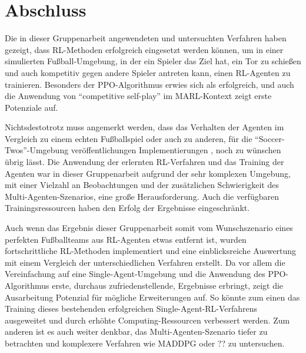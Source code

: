 \chapter{Abschluss} \label{chapter:4}

Die in dieser Gruppenarbeit angewendeten und untersuchten Verfahren haben gezeigt, dass \ac{RL}-Methoden erfolgreich eingesetzt werden können, um in einer simulierten Fußball-Umgebung, in der ein Spieler das Ziel hat, ein Tor zu schießen und auch kompetitiv gegen andere Spieler antreten kann, einen \ac{RL}-Agenten zu trainieren. Besonders der \ac{PPO}-Algorithmus erwies sich als erfolgreich, und auch die Anwendung von \enquote{competitive self-play} im \ac{MARL}-Kontext zeigt erste Potenziale auf.

Nichtsdestotrotz muss angemerkt werden, dass das Verhalten der Agenten im Vergleich zu einem echten Fußballspiel oder auch zu anderen, für die \enquote{Soccer-Twos}-Umgebung veröffentlichungen Implementierungen \cite{todo}, noch zu wünschen übrig lässt. Die Anwendung der erlernten \ac{RL}-Verfahren und das Training der Agenten war in dieser Gruppenarbeit aufgrund der sehr komplexen Umgebung, mit einer Vielzahl an Beobachtungen und der zusätzlichen Schwierigkeit des Multi-Agenten-Szenarios, eine große Herausforderung. Auch die verfügbaren Trainingsressourcen haben den Erfolg der Ergebnisse eingeschränkt.

Auch wenn das Ergebnis dieser Gruppenarbeit somit vom Wunschszenario eines perfekten Fußballteams aus \ac{RL}-Agenten etwas entfernt ist, wurden fortschrittliche \ac{RL}-Methoden implementiert und eine einblicksreiche Auswertung mit einem Vergleich der unterschiedlichen Verfahren erstellt. Da vor allem die Vereinfachung auf eine Single-Agent-Umgebung und die Anwendung des \ac{PPO}-Algorithmus erste, durchaus zufriedenstellende, Ergebnisse erbringt, zeigt die Ausarbeitung Potenzial für mögliche Erweiterungen auf. So könnte zum einen das Training dieses bestehenden erfolgreichen Single-Agent-RL-Verfahrens ausgeweitet und durch erhöhte Computing-Ressourcen verbessert werden. Zum anderen ist es auch weiter denkbar, das Multi-Agenten-Szenario tiefer zu betrachten und komplexere Verfahren wie MADDPG oder ?? zu untersuchen.